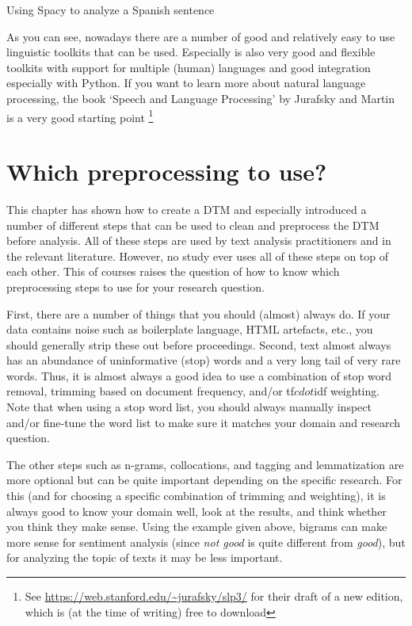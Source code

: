 \begin{ccsexample}
  \caption{Using Spacy to analyze a Spanish sentence}\label{ex:spacy}
\end{ccsexample}

As you can see, nowadays there are a number of good and relatively easy to use linguistic toolkits that can be used.
Especially  \citep{stanza} is also very good and flexible toolkits with support for multiple (human) languages and good integration especially with Python.
If you want to learn more about natural language processing, the book `Speech and Language Processing' by Jurafsky and Martin is a very good starting point \citep{jurafsky}\footnote{See \url{https://web.stanford.edu/~jurafsky/slp3/} for their draft of a new edition, which is (at the time of writing) free to download}


\section{Which preprocessing to use?}

This chapter has shown how to create a DTM and especially introduced a number of different steps that can be used to clean and preprocess the DTM before analysis.
All of these steps are used by text analysis practitioners and in the relevant literature.
However, no study ever uses all of these steps on top of each other.
This of courses raises the question of how to know which preprocessing steps to use for your research question.

First, there are a number of things that you should (almost) always do.
If your data contains noise such as boilerplate language, HTML artefacts, etc., you should generally strip these out before proceedings.
Second, text almost always has an abundance of uninformative (stop) words and a very long tail of very rare words.
Thus, it is almost always a good idea to use a combination of stop word removal, trimming based on document frequency, and/or tf$cdot$idf weighting.
Note that when using a stop word list, you should always manually inspect and/or fine-tune the word list to make sure it matches your domain and research question.

The other steps such as n-grams, collocations, and tagging and lemmatization are more optional but can be quite important depending on the specific research.
For this (and for choosing a specific combination of trimming and weighting), it is always good to know your domain well, look at the results, and think whether you think they make sense.
Using the example given above, bigrams can make more sense for sentiment analysis (since \emph{not good} is quite different from \emph{good}),
but for analyzing the topic of texts it may be less important.

